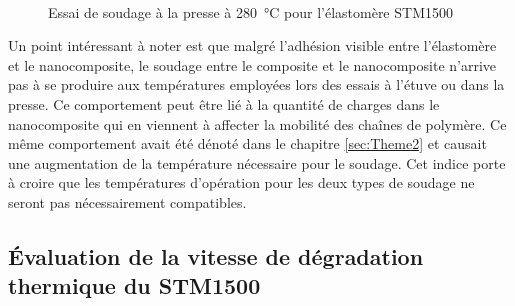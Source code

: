 \begin{figure}[h]
	\centering
	 \\ 
	 \qquad
	\caption{Essai de soudage dans une étuve sous vide à \SI{280}{\celsius} pour l'élastomère STM1500}
	\label{fig:etuve_STM1500}

	\centering
	 \qquad
	\caption{Essai de soudage à la presse à \SI{280}{\celsius} pour l'élastomère STM1500}
	\label{fig:presse_STM1500}
\end{figure}

Un point intéressant à noter est que malgré l'adhésion visible entre l'élastomère et le nanocomposite, le soudage entre le composite et le nanocomposite n'arrive pas à se produire aux températures employées lors des essais à l'étuve ou dans la presse. 
Ce comportement peut être lié à la quantité de charges dans le nanocomposite qui en viennent à affecter la mobilité des chaînes de polymère. 
Ce même comportement avait été dénoté dans le chapitre \ref{sec:Theme2} et causait une augmentation de la température nécessaire pour le soudage. 
Cet indice porte à croire que les températures d'opération pour les deux types de soudage ne seront pas nécessairement compatibles. 

\FloatBarrier

\subsection{Évaluation de la vitesse de dégradation thermique du STM1500}

